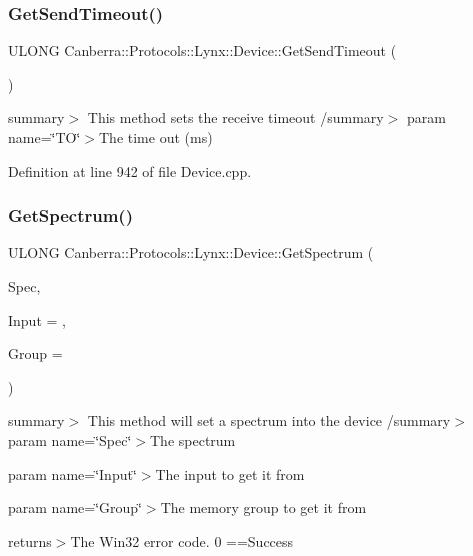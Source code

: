 \subsubsection{\texorpdfstring{Get\+Send\+Timeout()}{GetSendTimeout()}}
{\footnotesize\ttfamily U\+L\+O\+NG Canberra\+::\+Protocols\+::\+Lynx\+::\+Device\+::\+Get\+Send\+Timeout (\begin{DoxyParamCaption}{ }\end{DoxyParamCaption})}

summary$>$ This method sets the receive timeout /summary$>$ param name=\char`\"{}\+T\+O\char`\"{}$>$The time out (ms) 

Definition at line 942 of file Device.\+cpp.

\mbox{\label{class_canberra_1_1_protocols_1_1_lynx_1_1_device_af6cdb15c1c210b5efef509fa501cf8f8_af6cdb15c1c210b5efef509fa501cf8f8}} 
\subsubsection{\texorpdfstring{Get\+Spectrum()}{GetSpectrum()}}
{\footnotesize\ttfamily U\+L\+O\+NG Canberra\+::\+Protocols\+::\+Lynx\+::\+Device\+::\+Get\+Spectrum (\begin{DoxyParamCaption}\item[{\hyperlink{class_canberra_1_1_data_types_1_1_spectroscopy_1_1_spectrum}{Canberra\+::\+Data\+Types\+::\+Spectroscopy\+::\+Spectrum} \&}]{Spec,  }\item[{U\+S\+H\+O\+RT}]{Input = {},  }\item[{U\+S\+H\+O\+RT}]{Group = {} }\end{DoxyParamCaption})}

summary$>$ This method will set a spectrum into the device /summary$>$ param name=\char`\"{}\+Spec\char`\"{}$>$The spectrum

param name=\char`\"{}\+Input\char`\"{}$>$The input to get it from

param name=\char`\"{}\+Group\char`\"{}$>$The memory group to get it from

returns$>$The Win32 error code. 0 ==Success

